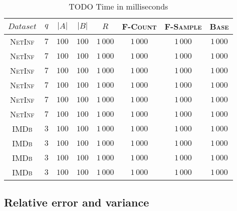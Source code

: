 	\begin{table}[h]
		\centering
		\label{my-label}
		\begin{tabular}{|c|c|c|c|c|c|c|c|}
			\hline
			$Dataset$       & $q$  & $|A|$ & $|B|$ & $R$ & \textsc{F-Count} & \textsc{F-Sample} & \textsc{Base} \\ \hline
			\textsc{NetInf} & $7$  & $100$ & $100$ & $1\,000$ & $1\,000$ & $1\,000$ & $1\,000$ \\ \hline
			\textsc{NetInf} & $7$  & $100$ & $100$ & $1\,000$ & $1\,000$ & $1\,000$ & $1\,000$ \\ \hline
			\textsc{NetInf} & $7$  & $100$ & $100$ & $1\,000$ & $1\,000$ & $1\,000$ & $1\,000$ \\ \hline
			\textsc{NetInf} & $7$  & $100$ & $100$ & $1\,000$ & $1\,000$ & $1\,000$ & $1\,000$ \\ \hline
			\textsc{NetInf} & $7$  & $100$ & $100$ & $1\,000$ & $1\,000$ & $1\,000$ & $1\,000$ \\ \hline
			\textsc{NetInf} & $7$  & $100$ & $100$ & $1\,000$ & $1\,000$ & $1\,000$ & $1\,000$ \\ \hline
			\textsc{IMDb}   & $3$  & $100$ & $100$ & $1\,000$ & $1\,000$ & $1\,000$ & $1\,000$ \\ \hline
			\textsc{IMDb}   & $3$  & $100$ & $100$ & $1\,000$ & $1\,000$ & $1\,000$ & $1\,000$ \\ \hline
			\textsc{IMDb}   & $3$  & $100$ & $100$ & $1\,000$ & $1\,000$ & $1\,000$ & $1\,000$ \\ \hline
			\textsc{IMDb}   & $3$  & $100$ & $100$ & $1\,000$ & $1\,000$ & $1\,000$ & $1\,000$ \\ \hline
			
		\end{tabular}
		\caption{TODO Time in milliseconds}
	\end{table}
	
	
	
	\subsection*{Relative error and variance}
	
		
